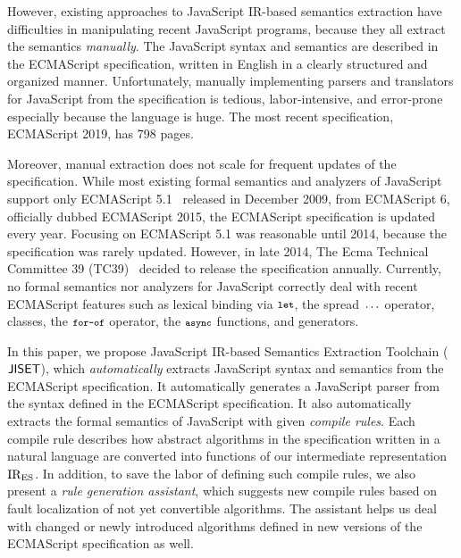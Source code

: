 However, existing approaches to JavaScript IR-based semantics
extraction have difficulties in manipulating recent JavaScript
programs, because they all extract the semantics \textit{manually}.
The JavaScript syntax and semantics are described in the ECMAScript
specification, written in English in a clearly structured and
organized manner.  Unfortunately, manually implementing parsers and
translators for JavaScript from the specification is tedious,
labor-intensive, and error-prone especially because the language is
huge.  The most recent specification, ECMAScript 2019, has 798 pages.

Moreover, manual extraction does not scale for frequent updates of the
specification.  While most existing formal semantics and analyzers of
JavaScript support only ECMAScript 5.1~\cite{ecma5} released in December 2009,
from ECMAScript 6, officially dubbed ECMAScript 2015, the 
ECMAScript specification is updated every year.  Focusing on
ECMAScript 5.1 was reasonable until 2014, because the
specification was rarely updated.  However, in late 2014, The Ecma
Technical Committee 39 (TC39)~\cite{tc39} decided to release the
specification annually.  Currently, no formal semantics
nor analyzers for JavaScript correctly deal with recent ECMAScript
features such as lexical binding via \( \texttt{\footnotesize let} \), the spread
\( \texttt{\footnotesize...} \) operator, classes, the \( \texttt{\footnotesize for-of} \) operator,
the \( \texttt{\footnotesize async} \) functions, and generators.

In this paper, we propose JavaScript IR-based Semantics Extraction
Toolchain (\( \text{\sf JISET} \)), which \textit{automatically} extracts JavaScript
syntax and semantics from the ECMAScript specification.  It
automatically generates a JavaScript parser from the syntax defined in
the ECMAScript specification.  It also automatically extracts the
formal semantics of JavaScript with given \textit{compile rules}.
Each compile rule describes how abstract algorithms in the
specification written in a natural language are converted into
functions of our intermediate representation \( \text{IR}_\text{ES} \).  In
addition, to save the labor of defining such compile rules, we also
present a \textit{rule generation assistant}, which suggests new
compile rules based on fault localization of not yet convertible
algorithms.  The assistant helps us deal with changed or newly
introduced algorithms defined in new versions of the ECMAScript
specification as well.

